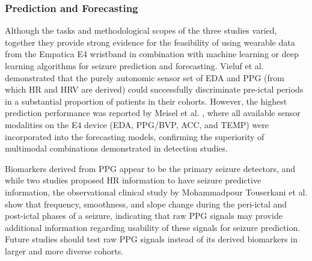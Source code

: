 \subsubsection{Prediction and Forecasting}
Although the tasks and methodological scopes of the three studies varied, together they provide strong evidence for the feasibility of using wearable data from the Empatica E4 wristband in combination with machine learning or deep learning algorithms for seizure prediction and forecasting. Vieluf et al. \cite{Vieluf2023-ta,Vieluf2023-zv} demonstrated that the purely autonomic sensor set of EDA and PPG (from which HR and HRV are derived) could successfully discriminate pre-ictal periods in a substantial proportion of patients in their cohorts. However, the highest prediction performance was reported by Meisel et al. \cite{Meisel2020-ii}, where all available sensor modalities on the E4 device (EDA, PPG/BVP, ACC, and TEMP) were incorporated into the forecasting models, confirming the superiority of multimodal combinations demonstrated in detection studies. 

Biomarkers derived from PPG appear to be the primary seizure detectors, and while two studies \cite{Vieluf2023-ta,Vieluf2023-zv} proposed HR information to have seizure predictive information, the observational clinical study by Mohammadpour Touserkani et al. \cite{Mohammadpour_Touserkani2020-tk} show that frequency, smoothness, and slope change during the peri-ictal and post-ictal phases of a seizure, indicating that raw PPG signals may provide additional information regarding usability of these signals for seizure prediction. Future studies should test raw PPG signals instead of its derived biomarkers in larger and more diverse cohorts.